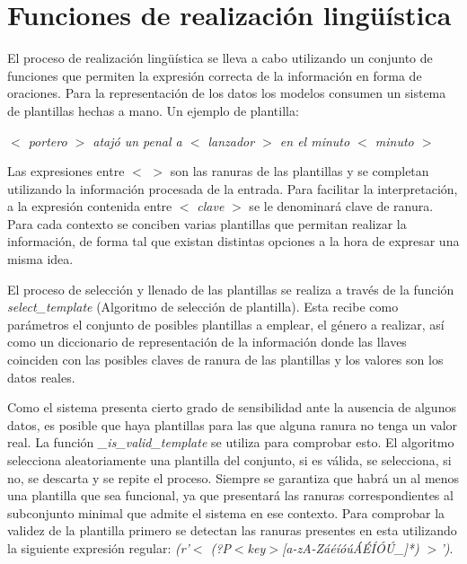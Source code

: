 \section{Funciones de realización lingüística}

   El proceso de realización lingüística se lleva a cabo utilizando un conjunto de funciones que permiten la expresión correcta de la información 
en forma de oraciones. Para la representación de los datos los modelos consumen un sistema de plantillas hechas a mano. Un ejemplo de plantilla:

	\begin{center}
		\textit{$<$ portero $>$ atajó un penal a $<$ lanzador $>$ en el minuto $<$ minuto $>$}
	\end{center}

Las expresiones entre $<$ $>$ son las ranuras de las plantillas y se completan utilizando la información procesada de la entrada. Para facilitar la interpretación, 
a la expresión contenida entre $<$ \textit{clave} $>$ se le denominará clave de ranura. Para cada contexto se conciben varias plantillas que permitan realizar la información, 
de forma tal que existan distintas opciones a la hora de expresar una misma idea.

  El proceso de selección y llenado de las plantillas se realiza a través de la función \emph{select\_template} (Algoritmo de selección de plantilla). 
  Esta recibe como parámetros el conjunto de posibles plantillas a emplear, el género a realizar, así como un diccionario de representación de la 
información donde las llaves coinciden con las posibles claves de ranura de las plantillas y los valores son los datos reales. 


  Como el sistema presenta cierto grado de sensibilidad ante la ausencia de algunos datos, es posible que haya plantillas para las que alguna ranura no tenga un 
valor real. La función \emph{\_is\_valid\_template} se utiliza para comprobar esto. El algoritmo selecciona aleatoriamente una plantilla del conjunto, si es válida, 
se selecciona, si no, se descarta y se repite el proceso. Siempre se garantiza que habrá un al menos una plantilla que sea funcional, ya que presentará las ranuras 
correspondientes al subconjunto minimal que admite el sistema en ese contexto. Para comprobar la validez de la plantilla primero 
se detectan las ranuras presentes en esta utilizando la siguiente expresión regular: \textit{(r'$<$ (?P$<$key$>$[a-zA-ZáéíóúÁÉÍÓÚ\_]*) $>$')}.
  
